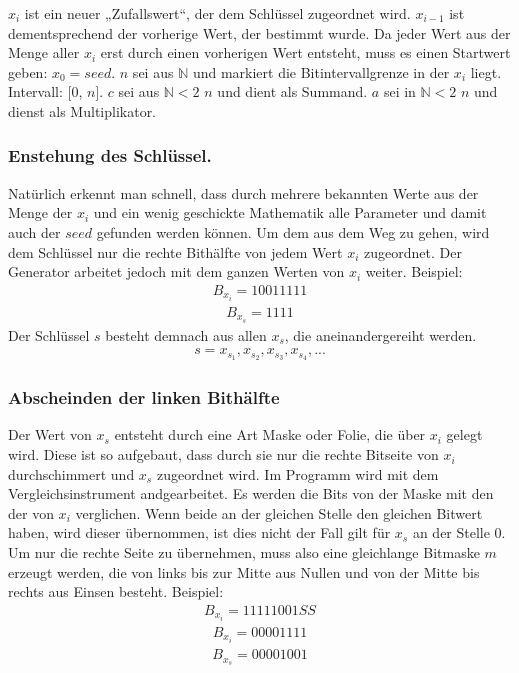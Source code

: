 \documentclass[10pt,a4paper]{article}
\begin{document}
$x_i$ ist ein neuer „Zufallswert“, der dem Schlüssel zugeordnet wird.
$x_{i-1}$ ist dementsprechend der vorherige Wert, der bestimmt wurde.
Da jeder Wert aus der Menge aller $x_i$ erst durch einen vorherigen Wert entsteht, muss es einen
Startwert geben: $x_0 = seed $.
$n$ sei aus $ \mathbb{N} $ und markiert die Bitintervallgrenze in der $x_i$
liegt. Intervall: [0, $n$].
$c$ sei aus  $ \mathbb{N}<2 $
$n$ und dient als Summand.
$a$ sei in $ \mathbb{N}< 2 $
$n$ und dienst als Multiplikator.
\subsubsection{Enstehung des Schlüssel.}
Natürlich erkennt man schnell, dass durch mehrere bekannten Werte aus der Menge der $x_i$ und ein wenig geschickte Mathematik alle Parameter und damit auch der $seed$ gefunden werden können. Um dem aus dem Weg zu gehen, wird dem Schlüssel nur die rechte Bithälfte von jedem Wert $x_i$ zugeordnet. Der Generator arbeitet jedoch mit dem ganzen Werten von $x_i$ weiter. Beispiel:
\begin{align*}
    B_{x_i} = 1001 1111
\end{align*}
\begin{align*}
    B_{x_s} = 1111
\end{align*}
Der Schlüssel $s$ besteht demnach aus allen $x_s$, die aneinandergereiht werden.
\begin{align*}
    s = x_{s_1}, x_{s_2}, x_{s_3}, x_{s_4}, ...
\end{align*}

\subsubsection{Abscheinden der linken Bithälfte}
Der Wert von $x_s$ entsteht durch eine Art Maske oder Folie, die über $x_i$ gelegt wird. Diese ist so aufgebaut, dass durch sie nur die rechte Bitseite von $x_i$ durchschimmert und $x_s$ zugeordnet wird. Im Programm wird mit dem Vergleichsinstrument \flqq and\frqq gearbeitet. Es werden die Bits von der Maske mit den der von $x_i$ verglichen. Wenn beide an der gleichen Stelle den gleichen Bitwert haben, wird dieser übernommen, ist dies nicht der Fall gilt für $x_s$ an der Stelle 0. Um nur die rechte Seite zu übernehmen, muss also eine gleichlange Bitmaske $m$ erzeugt werden, die von links bis zur Mitte aus Nullen und von der Mitte bis rechts aus Einsen besteht.
Beispiel:
\begin{align*}
    B_{x_i} = 1111 1001SS
\end{align*}
\begin{align*}
    B_{x_i} = 0000 1111
\end{align*}
\begin{align*}
    B_{x_s} = 0000 1001
\end{align*}
\end{document}
